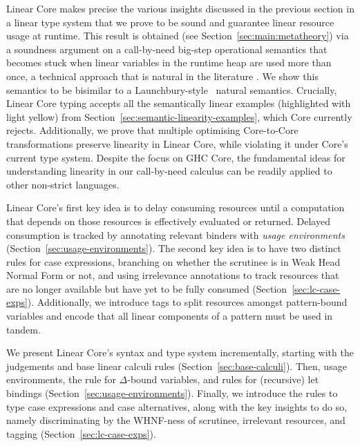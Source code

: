 \documentclass[acmsmall,review,screen]{acmart}
\newcommand{\notyetcolorname}{light yellow}
\newcommand{\ROUNDTWO}[1]{{\color{red}#1}}
\begin{document}
Linear Core makes precise the various insights discussed in the
previous section in a linear type system that we prove \ROUNDTWO{to be} sound and guarantee
linear resource usage at runtime.
This result is obtained (see Section~\ref{sec:main:metatheory}) via a soundness argument on a
call-by-need big-step operational semantics that becomes stuck when linear
variables in the runtime heap are used more than once, \ROUNDTWO{a
  technical approach that is natural in the literature \cite{}}. We show this
semantics to be bisimilar to a
Launchbury-style~\cite{10.1145/158511.158618} natural semantics. 
Crucially,
Linear Core typing accepts all the semantically linear examples
(highlighted with \colorbox{notyet}{\notyetcolorname})
from Section~\ref{sec:semantic-linearity-examples}, which Core currently
rejects.
%
Additionally, we prove that multiple optimising Core-to-Core transformations
preserve linearity in Linear Core, while violating it under Core's
current type system.
%
% 
Despite the focus on GHC Core, the fundamental ideas for
understanding linearity in our call-by-need calculus can be readily applied to
other non-strict languages.

Linear Core's first key idea is to delay consuming
resources until a computation that depends on those resources is effectively
evaluated or returned. Delayed consumption is tracked by annotating relevant
binders with \emph{usage environments} (Section~\ref{sec:usage-environments}).
%
The second key idea is to have two distinct rules for case
expressions, branching on whether the scrutinee is in Weak Head Normal
Form or not, and using  \ROUNDTWO{irrelevance annotations} to track resources that are no
longer available but have yet to be fully consumed
(Section~\ref{sec:lc-case-exps}). Additionally, we introduce tags to split
resources amongst pattern-bound variables and %
encode that all linear components of a pattern must be used in tandem.

We present Linear Core's syntax and type system incrementally, starting with the
judgements and base linear calculi rules (Section~\ref{sec:base-calculi}).
%
Then, usage environments, the rule for $\Delta$-bound variables, and rules for
(recursive) let bindings (Section~\ref{sec:usage-environments}).
%
Finally, we introduce the rules to type case expressions and case alternatives,
along with the key insights to do so, namely \ROUNDTWO{discriminating by} the WHNF-ness of
scrutinee, irrelevant resources, and tagging (Section~\ref{sec:lc-case-exps}).
\end{document}
